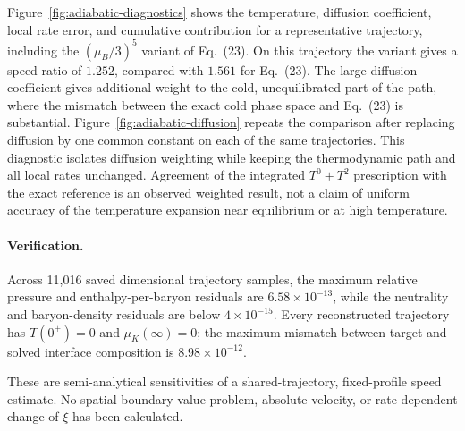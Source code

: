 Figure~\ref{fig:adiabatic-diagnostics} shows the temperature, diffusion coefficient, local rate error, and cumulative contribution for a representative trajectory, including the \((\mu_B/3)^5\) variant of Eq.~(23).
On this trajectory the variant gives a speed ratio of \(1.252\), compared with \(1.561\) for Eq.~(23).
The large diffusion coefficient gives additional weight to the cold, unequilibrated part of the path, where the mismatch between the exact cold phase space and Eq.~(23) is substantial.
Figure~\ref{fig:adiabatic-diffusion} repeats the comparison after replacing diffusion by one common constant on each of the same trajectories.
This diagnostic isolates diffusion weighting while keeping the thermodynamic path and all local rates unchanged.
Agreement of the integrated \(T^0+T^2\) prescription with the exact reference is an observed weighted result, not a claim of uniform accuracy of the temperature expansion near equilibrium or at high temperature.
\paragraph{Verification.}
Across 11,016 saved dimensional trajectory samples, the maximum relative pressure and enthalpy-per-baryon residuals are \(6.58\times10^{-13}\), while the neutrality and baryon-density residuals are below \(4\times10^{-15}\).
Every reconstructed trajectory has \(T(0^+)=0\) and \(\mu_K(\infty)=0\); the maximum mismatch between target and solved interface composition is \(8.98\times10^{-12}\).

\par
These are semi-analytical sensitivities of a shared-trajectory, fixed-profile speed estimate.
No spatial boundary-value problem, absolute velocity, or rate-dependent change of \(\xi\) has been calculated.

